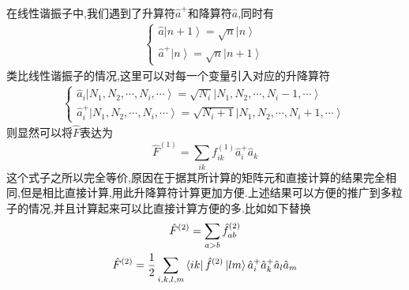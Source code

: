 在线性谐振子中,我们遇到了升算符$\hat{a}^+$和降算符$\hat{a}$,同时有
\begin{gather}
  \left\{
    \begin{gathered}
      \hat{a}\left|n+1\right>=\sqrt{n}\left|n\right>\\
      \hat{a}^+\left|n\right>=\sqrt{n}\left|n+1\right>
    \end{gathered}
  \right.
\end{gather}
类比线性谐振子的情况,这里可以对每一个变量引入对应的升降算符
\begin{gather}
 \left\{
   \begin{gathered}
     \hat{a}_i\left|N_1,N_2,\cdots,N_i,\cdots\right>=\sqrt{N_i}\left|N_1,N_2,\cdots,N_i-1,\cdots\right>\\
     \hat{a}_i^+\left|N_1,N_2,\cdots,N_i,\cdots\right>=\sqrt{N_i+1}\left|N_1,N_2,\cdots,N_i+1,\cdots\right>
   \end{gathered}
   \right.
\end{gather}
则显然可以将$\hat{F}$表达为
\begin{equation}
  \hat{F}^{(1)}=\sum_{ik} f^{(1)}_{ik}\hat{a}_i^+\hat{a}_k
\end{equation}
这个式子之所以完全等价,原因在于据其所计算的矩阵元和直接计算的结果完全相同,但是相比直接计算,用此升降算符计算更加方便.上述结果可以方便的推广到多粒子的情况,并且计算起来可以比直接计算方便的多.比如如下替换
\begin{gather}
     \hat{F}^{(2)}=\sum_{a>b}\hat{f}^{(2)}_{ab}\notag\\
     \hat{F}^{(2)}=\frac{1}{2}\sum_{i,k,l,m}\left<ik\right|\hat{f}^{(2)}\left |lm\right>
     \hat{a}_i^+\hat{a}_k^+\hat{a}_l\hat{a}_m
\end{gather}


